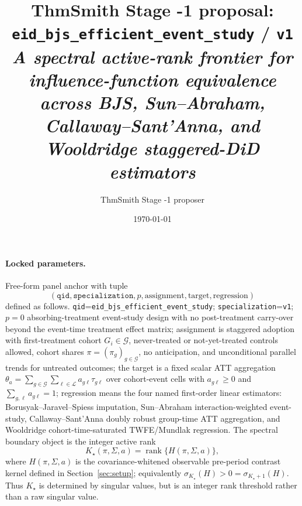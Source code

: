 \documentclass[11pt]{article}
\title{ThmSmith Stage -1 proposal: \texttt{eid\_bjs\_efficient\_event\_study} / \texttt{v1}%
  \\ \large\textit{A spectral active-rank frontier for influence-function equivalence across BJS, Sun--Abraham, Callaway--Sant'Anna, and Wooldridge staggered-DiD estimators}}
\author{ThmSmith Stage -1 proposer}
\date{\today}
\theoremstyle{definition}
\theoremstyle{plain}
\theoremstyle{remark}
\begin{document}
\maketitle


\paragraph{Locked parameters.}
Free-form panel anchor with tuple
\[
(\texttt{qid},\texttt{specialization},p,\text{assignment},\text{target},\text{regression})
\]
defined as follows.  \texttt{qid}=\texttt{eid\_bjs\_efficient\_event\_study};
\texttt{specialization}=\texttt{v1}; \(p=0\) absorbing-treatment event-study design
with no post-treatment carry-over beyond the event-time treatment effect matrix;
assignment is staggered adoption with first-treatment cohort \(G_i\in\mathcal G\),
never-treated or not-yet-treated controls allowed, cohort shares
\(\pi=(\pi_g)_{g\in\mathcal G}\), no anticipation, and unconditional parallel
trends for untreated outcomes; the target is a fixed scalar ATT aggregation
\(\theta_a=\sum_{g\in\mathcal G}\sum_{\ell\in\mathcal L}a_{g\ell}\tau_{g\ell}\)
over cohort-event cells with \(a_{g\ell}\ge 0\) and
\(\sum_{g,\ell}a_{g\ell}=1\); regression means the four named first-order
linear estimators: Borusyak--Jaravel--Spiess imputation, Sun--Abraham
interaction-weighted event-study, Callaway--Sant'Anna doubly robust group-time
ATT aggregation, and Wooldridge cohort-time-saturated TWFE/Mundlak regression.
The spectral boundary object is the integer active rank
\[
K_\star(\pi,\Sigma,a)=\operatorname{rank}\{H(\pi,\Sigma,a)\},
\]
where \(H(\pi,\Sigma,a)\) is the covariance-whitened observable pre-period
contrast kernel defined in Section~\ref{sec:setup}; equivalently
\(\sigma_{K_\star}(H)>0=\sigma_{K_\star+1}(H)\).  Thus \(K_\star\) is determined
by singular values, but is an integer rank threshold rather than a raw singular
value.
\end{document}
